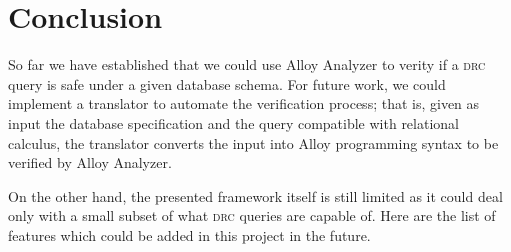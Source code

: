 \section{Conclusion}

So far we have established that we could use Alloy Analyzer to verity if a \textsc{drc} query is safe under a given database schema. For future work, we could implement a translator to automate the verification process; that is, given as input the database specification and the query compatible with relational calculus, the translator converts the input into Alloy programming syntax to be verified by Alloy Analyzer.

On the other hand, the presented framework itself is still limited as it could deal only with a small subset of what \textsc{drc} queries are capable of. Here are the list of features which could be added in this project in the future.
